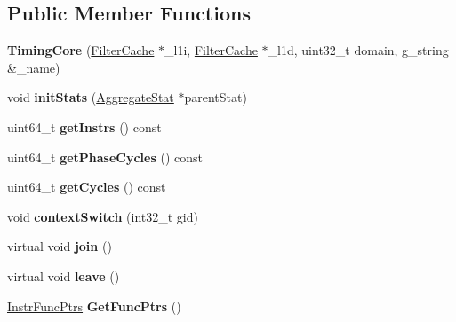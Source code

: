 \subsection*{Public Member Functions}
\begin{DoxyCompactItemize}
\item 
\hypertarget{classTimingCore_a9826786ed86142396e541a6d13339217}{{\bfseries Timing\-Core} (\hyperlink{classFilterCache}{Filter\-Cache} $\ast$\-\_\-l1i, \hyperlink{classFilterCache}{Filter\-Cache} $\ast$\-\_\-l1d, uint32\-\_\-t domain, g\-\_\-string \&\-\_\-name)}\label{classTimingCore_a9826786ed86142396e541a6d13339217}

\item 
\hypertarget{classTimingCore_ae4337708a106937c89f2e5a3ea31c1ce}{void {\bfseries init\-Stats} (\hyperlink{classAggregateStat}{Aggregate\-Stat} $\ast$parent\-Stat)}\label{classTimingCore_ae4337708a106937c89f2e5a3ea31c1ce}

\item 
\hypertarget{classTimingCore_a1f64d530955f36b6b58e6965f5711b3c}{uint64\-\_\-t {\bfseries get\-Instrs} () const }\label{classTimingCore_a1f64d530955f36b6b58e6965f5711b3c}

\item 
\hypertarget{classTimingCore_aaa32e933d0ff21c27cf9a60e9106b5aa}{uint64\-\_\-t {\bfseries get\-Phase\-Cycles} () const }\label{classTimingCore_aaa32e933d0ff21c27cf9a60e9106b5aa}

\item 
\hypertarget{classTimingCore_a18dafd009f0da4ba9d89c3dd68807c82}{uint64\-\_\-t {\bfseries get\-Cycles} () const }\label{classTimingCore_a18dafd009f0da4ba9d89c3dd68807c82}

\item 
\hypertarget{classTimingCore_abe9cbfc2bfa815cf16f32dca2d6746ca}{void {\bfseries context\-Switch} (int32\-\_\-t gid)}\label{classTimingCore_abe9cbfc2bfa815cf16f32dca2d6746ca}

\item 
\hypertarget{classTimingCore_af2a7894c44d9cd4f9a63f57d46323485}{virtual void {\bfseries join} ()}\label{classTimingCore_af2a7894c44d9cd4f9a63f57d46323485}

\item 
\hypertarget{classTimingCore_ad07c6e7c14425c60e1cd1af47bba5a1a}{virtual void {\bfseries leave} ()}\label{classTimingCore_ad07c6e7c14425c60e1cd1af47bba5a1a}

\item 
\hypertarget{classTimingCore_a6be334bfbad52433841c5ebbdf6c74d5}{\hyperlink{structInstrFuncPtrs}{Instr\-Func\-Ptrs} {\bfseries Get\-Func\-Ptrs} ()}\label{classTimingCore_a6be334bfbad52433841c5ebbdf6c74d5}


\end{DoxyCompactItemize}
